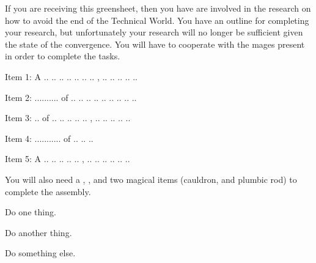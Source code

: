 \documentclass[green]{guildcamp3}
\begin{document}
\name{\gSaveTheWorldScientists{}}






If you are receiving this greensheet, then you have are involved in the research on how to avoid the end of the Technical World. You have an outline for completing your research, but unfortunately your research will no longer be sufficient given the state of the convergence. You will have to cooperate with the mages present in order to complete the tasks. 

Item 1: A .. .. .. .. .. .. .. , .. .. .. .. ..

Item 2: .......... of .. .. .. .. .. .. .. .. ..

Item 3: .. of .. .. .. .. ..  ,  .. .. .. .. ..

Item 4: ........... of .. .. .. 

Item 5: A .. .. .. .. ..  ,  .. .. .. .. .. ..

You will also need a \iMultitool{}, \iScrewdriver{}, and two magical items (cauldron, and plumbic rod) to complete the assembly. 

\begin{enum}[Directions]
  \item Do one thing.
  \item Do another thing.
  \item Do something else.
\end{enum}
\end{document}
